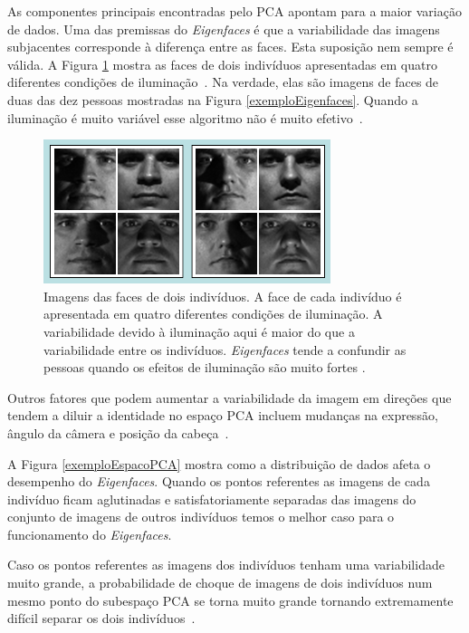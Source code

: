 	As componentes principais encontradas pelo PCA apontam para a maior variação de
	dados. Uma das premissas do \textit{Eigenfaces} é que a variabilidade das
	imagens subjacentes corresponde à diferença entre as faces. Esta suposição nem
	sempre é válida. A Figura \ref{exemplosImagensIluminacaoo} mostra as faces de
	dois indivíduos apresentadas em quatro diferentes condições de
	iluminação~\cite{hewitt}. Na verdade, elas são imagens de faces de duas das dez pessoas mostradas na
	Figura \ref{exemploEigenfaces}. Quando a iluminação é muito variável esse
	algoritmo não é muito efetivo~\cite{hewitt}.

	\begin{figure}[H]
		\begin{center}
			\includegraphics[scale=1.2]{figuras/2.FundamentacaoTeorica/exemplosImagensIluminacaoo.png}
		\end{center}
		\caption{Imagens das faces de dois indivíduos. A face de cada indivíduo é apresentada em quatro diferentes condições de iluminação. A variabilidade devido à iluminação aqui é maior do que a variabilidade entre os indivíduos. \textit{Eigenfaces} tende a confundir as pessoas quando os efeitos de iluminação são muito fortes \cite{hewitt}.}
		\label{exemplosImagensIluminacaoo}
	\end{figure}

	Outros fatores que podem aumentar a variabilidade da imagem em direções que
	tendem a diluir a identidade no espaço PCA incluem mudanças na expressão, ângulo
	da câmera e posição da cabeça~\cite{hewitt}.
	
	A Figura \ref{exemploEspacoPCA} mostra como a distribuição de dados afeta o
	desempenho do \textit{Eigenfaces}. Quando os pontos referentes as imagens de
	cada indivíduo ficam aglutinadas e satisfatoriamente separadas das imagens do conjunto de imagens de outros
	indivíduos temos o melhor caso para o funcionamento do \textit{Eigenfaces}.
	
	Caso os pontos referentes as imagens dos indivíduos tenham uma variabilidade
	muito grande, a probabilidade de choque de imagens de dois indivíduos num mesmo
	ponto do subespaço PCA se torna muito grande tornando extremamente difícil
	separar os dois indivíduos~\cite{hewitt}.
	
